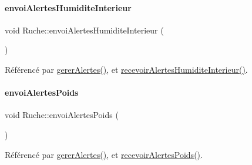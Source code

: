 \mbox{\label{class_ruche_a0f1dfe6d0a677341e29296e044d91975}} 
\paragraph{\texorpdfstring{envoi\+Alertes\+Humidite\+Interieur}{envoiAlertesHumiditeInterieur}}
{\footnotesize\ttfamily void Ruche\+::envoi\+Alertes\+Humidite\+Interieur (\begin{DoxyParamCaption}\item[{\hyperlink{parametres_8h_aaa6de8207c94675264c90b10b613368d}{Seuils\+Alertes}}]{ }\end{DoxyParamCaption})\hspace{0.3cm}{\ttfamily [signal]}}



Référencé par \hyperlink{class_ruche_a80f3538f081aea887d7199f114dfca01}{gerer\+Alertes()}, et \hyperlink{class_ruche_af7b500ef1469f689dfe6b78ae6e3c025}{recevoir\+Alertes\+Humidite\+Interieur()}.

\mbox{\label{class_ruche_a21d7f05b696896b1a3c7e20c396aaf23}} 
\paragraph{\texorpdfstring{envoi\+Alertes\+Poids}{envoiAlertesPoids}}
{\footnotesize\ttfamily void Ruche\+::envoi\+Alertes\+Poids (\begin{DoxyParamCaption}\item[{\hyperlink{parametres_8h_aaa6de8207c94675264c90b10b613368d}{Seuils\+Alertes}}]{ }\end{DoxyParamCaption})\hspace{0.3cm}{\ttfamily [signal]}}



Référencé par \hyperlink{class_ruche_a80f3538f081aea887d7199f114dfca01}{gerer\+Alertes()}, et \hyperlink{class_ruche_aa5dc6e5c65d0a685dcaa1c698b25e938}{recevoir\+Alertes\+Poids()}.

\mbox{\label{class_ruche_a97ae09a121944f7df48fb38bd049b878}} 
